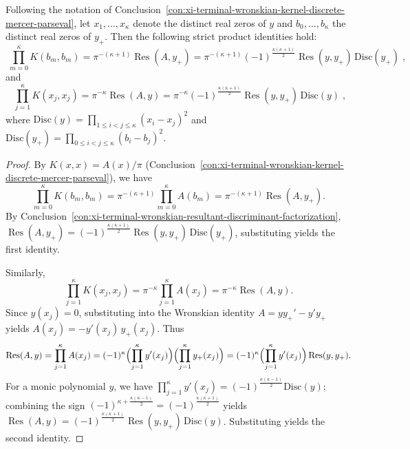 
\begin{conclusion}\label{con:xi-terminal-wronskian-diagonal-sampling-resultant-discriminant-product}
Following the notation of Conclusion~\ref{con:xi-terminal-wronskian-kernel-discrete-mercer-parseval}, let \(x_1,\dots,x_\kappa\) denote the distinct real zeros of \(y\) and \(b_0,\dots,b_\kappa\) the distinct real zeros of \(y_{+}\).
Then the following strict product identities hold:
\[
\boxed{\;
\prod_{m=0}^{\kappa}K(b_m,b_m)
=\pi^{-(\kappa+1)}\operatorname{Res}(A,y_{+})
=\pi^{-(\kappa+1)}(-1)^{\frac{\kappa(\kappa+1)}{2}}\operatorname{Res}(y,y_{+})\,\mathrm{Disc}(y_{+})\;},
\]
and
\[
\boxed{\;
\prod_{j=1}^{\kappa}K(x_j,x_j)
=\pi^{-\kappa}\operatorname{Res}(A,y)
=\pi^{-\kappa}(-1)^{\frac{\kappa(\kappa+1)}{2}}\operatorname{Res}(y,y_{+})\,\mathrm{Disc}(y)\;},
\]
where
\(
\mathrm{Disc}(y)=\prod_{1\le i<j\le \kappa}(x_i-x_j)^2
\)
and
\(
\mathrm{Disc}(y_{+})=\prod_{0\le i<j\le \kappa}(b_i-b_j)^2
\).
\end{conclusion}
\begin{proof}
By \(K(x,x)=A(x)/\pi\) (Conclusion~\ref{con:xi-terminal-wronskian-kernel-discrete-mercer-parseval}), we have
\[
\prod_{m=0}^{\kappa}K(b_m,b_m)=\pi^{-(\kappa+1)}\prod_{m=0}^{\kappa}A(b_m)
=\pi^{-(\kappa+1)}\operatorname{Res}(A,y_{+}).
\]
By Conclusion~\ref{con:xi-terminal-wronskian-resultant-discriminant-factorization},
\(
\operatorname{Res}(A,y_{+})
=(-1)^{\frac{\kappa(\kappa+1)}{2}}\operatorname{Res}(y,y_{+})\,\mathrm{Disc}(y_{+})
\), substituting yields the first identity.
\par
Similarly,
\[
\prod_{j=1}^{\kappa}K(x_j,x_j)=\pi^{-\kappa}\prod_{j=1}^{\kappa}A(x_j)
=\pi^{-\kappa}\operatorname{Res}(A,y).
\]
Since \(y(x_j)=0\), substituting into the Wronskian identity \(A=yy_{+}'-y'y_{+}\) yields
\(
A(x_j)=-y'(x_j)\,y_{+}(x_j)
\).
Thus
\[
\operatorname{Res}(A,y)
=\prod_{j=1}^{\kappa}A(x_j)
=(-1)^{\kappa}\Bigl(\prod_{j=1}^{\kappa}y'(x_j)\Bigr)\Bigl(\prod_{j=1}^{\kappa}y_{+}(x_j)\Bigr)
=(-1)^{\kappa}\Bigl(\prod_{j=1}^{\kappa}y'(x_j)\Bigr)\operatorname{Res}(y,y_{+}).
\]
For a monic polynomial \(y\), we have
\(
\prod_{j=1}^{\kappa}y'(x_j)=(-1)^{\frac{\kappa(\kappa-1)}{2}}\mathrm{Disc}(y)
\);
combining the sign \( (-1)^{\kappa+\frac{\kappa(\kappa-1)}{2}}=(-1)^{\frac{\kappa(\kappa+1)}{2}} \) yields
\(
\operatorname{Res}(A,y)
=(-1)^{\frac{\kappa(\kappa+1)}{2}}\operatorname{Res}(y,y_{+})\,\mathrm{Disc}(y)
\).
Substituting yields the second identity.
\end{proof}

